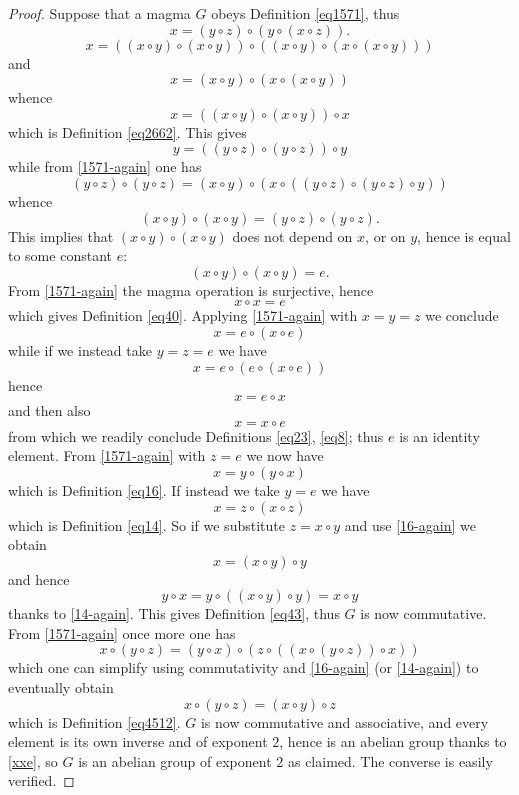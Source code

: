 \begin{proof}\leanok  Suppose that a magma $G$ obeys Definition \ref{eq1571}, thus
\begin{equation}\label{1571-again}
 x = (y \circ z) \circ (y \circ (x \circ z)).
\end{equation}
$$ x = ((x \circ y) \circ (x \circ y)) \circ ((x \circ y) \circ (x \circ (x \circ y)))$$
and
$$ x = (x \circ y) \circ (x \circ (x \circ y))$$
whence
$$x = ((x \circ y) \circ (x \circ y)) \circ x$$
which is Definition \ref{eq2662}.  This gives
$$y = ((y \circ z) \circ (y \circ z)) \circ y$$
while from \eqref{1571-again} one has
$$ (y \circ z) \circ (y \circ z) = (x \circ y) \circ (x \circ ((y \circ z) \circ (y \circ z) \circ y))$$
whence
$$ (x \circ y) \circ (x \circ y) = (y \circ z) \circ (y \circ z).$$
This implies that $(x \circ y) \circ (x \circ y)$ does not depend on $x$, or on $y$, hence is equal to some constant $e$:
$$ (x \circ y) \circ (x \circ y) = e.$$
From \eqref{1571-again} the magma operation is surjective, hence
\begin{equation}\label{xxe} x \circ x = e
\end{equation}
which gives Definition \ref{eq40}.  Applying \eqref{1571-again} with $x=y=z$ we conclude
$$ x = e \circ (x \circ e)$$
while if we instead take $y=z=e$ we have
$$ x = e \circ (e \circ (x \circ e))$$
hence
$$ x = e \circ x$$
and then also
$$ x = x \circ e$$
from which we readily conclude Definitions \ref{eq23}, \ref{eq8}; thus $e$ is an identity element.  From \eqref{1571-again} with $z=e$ we now have
\begin{equation}\label{16-again}
 x = y \circ (y \circ x)
\end{equation}
which is Definition \ref{eq16}. If instead we take $y=e$ we have
\begin{equation}\label{14-again}
  x = z \circ (x \circ z)
\end{equation}
which is Definition \ref{eq14}.  So if we substitute $z = x \circ y$ and use \eqref{16-again} we obtain
$$ x = (x \circ y) \circ y$$
and hence
$$ y \circ x = y \circ ((x \circ y) \circ y) = x \circ y$$
thanks to \eqref{14-again}.  This gives Definition \ref{eq43}, thus $G$ is now commutative.  From \eqref{1571-again} once more one has
$$x \circ (y \circ z) = (y \circ x) \circ (z \circ ((x \circ (y \circ z)) \circ x))$$
which one can simplify using commutativity and \eqref{16-again} (or \eqref{14-again}) to eventually obtain
$$x \circ (y \circ z) = (x \circ y) \circ z$$
which is Definition \ref{eq4512}.  $G$ is now commutative and associative, and every element is its own inverse and of exponent $2$, hence is an abelian group thanks to \eqref{xxe}, so $G$ is an abelian group of exponent $2$ as claimed.  The converse is easily verified.
\end{proof}

